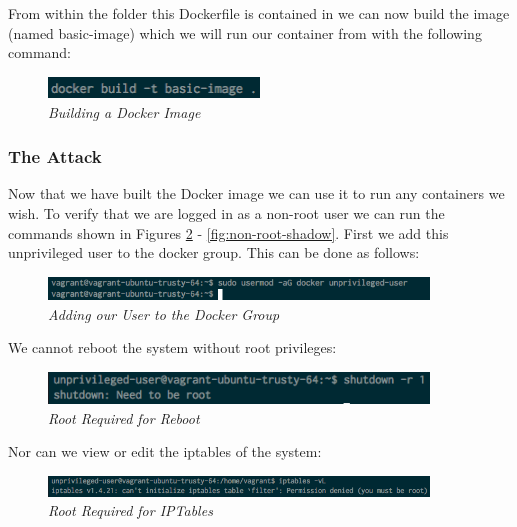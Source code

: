 \documentclass{article}
\begin{document}
From within the folder this Dockerfile is contained in we can now build the image (named basic-image) which we will run our container from with the following command:

\begin{figure}[!h]
\centering
\includegraphics*[width=0.5\textwidth]{components/images/build-image}
\caption{\em Building a Docker Image}
\label{fig:build}
\end{figure}

\newpage
\subsubsection{The Attack}
\label{subs:attack}
Now that we have built the Docker image we can use it to run any containers we wish. To verify that we are logged in as a non-root user we can run the commands shown in Figures \ref{fig:add-user} - \ref{fig:non-root-shadow}. First we add this unprivileged user to the docker group. This can be done as follows:

\begin{figure}[!h]
\centering
\includegraphics*[width=0.9\textwidth]{components/images/add-user-to-group}
\caption{\em Adding our User to the Docker Group}
\label{fig:add-user}
\end{figure}

We cannot reboot the system without root privileges:
\begin{figure}[!h]
\centering
\includegraphics*[width=0.9\textwidth]{components/images/non-root-reboot}
\caption{\em Root Required for Reboot}
\label{fig:non-root-reboot}
\end{figure}

Nor can we view or edit the iptables of the system:
\begin{figure}[!h]
\centering
\includegraphics*[width=0.9\textwidth]{components/images/non-root-iptables}
\caption{\em Root Required for IPTables}
\label{fig:non-root-iptables}
\end{figure}
\end{document}
